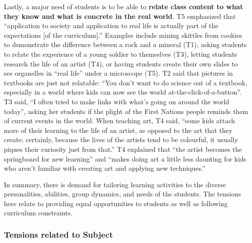 Lastly, a major need of students is to be able to \textbf{relate class content to what they know and what is concrete in the real world}. T5 emphasized that ``application to society and application to real life is actually part of the expectations [of the curriculum].'' Examples include mining skittles from cookies to demonstrate the difference between a rock and a mineral (T1), asking students to relate the experience of a young soldier to themselves (T3), letting students research the life of an artist (T4), or having students create their own slides to see organelles in ``real life'' under a microscope (T5). T2 said that pictures in textbooks are just not relatable: ``You don't want to do science out of a textbook, especially in a world where kids can now see the world at-the-click-of-a-button''.  T3 said, ``I often tried to make links with what's going on around the world today'', asking her students if the plight of the First Nations people reminds them of current events in the world. When teaching art, T4 said, ``some kids attach more of their learning to the life of an artist, as opposed to the art that they create; certainly, because the lives of the artists tend to be colourful, it usually piques their curiosity just from that.''  T4 explained that ``the artist becomes the springboard for new learning'' and ``makes doing art a little less daunting for kids who aren't familiar with creating art and applying new techniques.''  

In summary, there is demand for tailoring learning activities to the diverse personalities, abilities, group dynamics, and needs of the students. The tensions here relate to providing equal opportunities to students as well as following curriculum constraints.

 
 
\subsubsection{Tensions related to Subject}
\label{sec:15}
 

